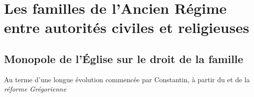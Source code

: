 

\chapter[Les familles de l'Ancien Régime entre autorités civiles et religieuses]{Les familles de l'Ancien Régime\\entre autorités civiles et religieuses}



\section{Monopole de l'Église sur le droit de la famille}

 Au terme d'une longue évolution commencée par Constantin, à partir du  et de la \emph{réforme Grégorienne}%
